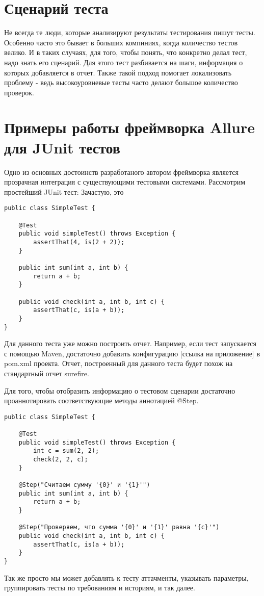 \section{Сценарий теста}

Не всегда те люди, которые анализируют результаты тестирования пишут тесты. Особенно часто это бывает в больших компиниях, когда количество тестов велико. И в таких случаях, для того, чтобы понять, что конкретно делал тест, надо знать его сценарий. Для этого тест разбивается на шаги, информация о которых добавляется в отчет. Также такой подход помогает локализовать проблему - ведь высокоуровневые тесты часто делают большое количество проверок.

\newpage
\section{Примеры работы фреймворка Allure для JUnit тестов}

Одно из основных достоинств разработаного автором фреймворка является прозрачная интеграция с существующими тестовыми системами. Рассмотрим простейший JUnit тест:
Зачастую, это 

 
\begin{lstlisting}
public class SimpleTest {

    @Test
    public void simpleTest() throws Exception {
        assertThat(4, is(2 + 2));
    }
    
    public int sum(int a, int b) {
		return a + b;
	}    
    
    public void check(int a, int b, int c) {
    	assertThat(c, is(a + b));	
    }
}
\end{lstlisting}

Для данного теста уже можно построить отчет. Например, если тест запускается с помощью Maven, достаточно добавить конфигурацию [ссылка на приложение] в pom.xml проекта. Отчет, построенный для данного теста будет похож на стандартный отчет surefire. 

Для того, чтобы отобразить информацию о тестовом сценарии достаточно проаннотировать соответствующие методы аннотацией @Step.

\begin{lstlisting}
public class SimpleTest {

    @Test
    public void simpleTest() throws Exception {
        int c = sum(2, 2);
        check(2, 2, c);
    }
    
    @Step("Считаем сумму '{0}' и '{1}'")
    public int sum(int a, int b) {
		return a + b;
	}    
    
    @Step("Проверяем, что сумма '{0}' и '{1}' равна '{c}'")
    public void check(int a, int b, int c) {
    	assertThat(c, is(a + b));	
    }
}
\end{lstlisting}

Так же просто мы может добавлять к тесту аттачменты, указывать параметры, группировать тесты по требованиям и историям, и так далее.
